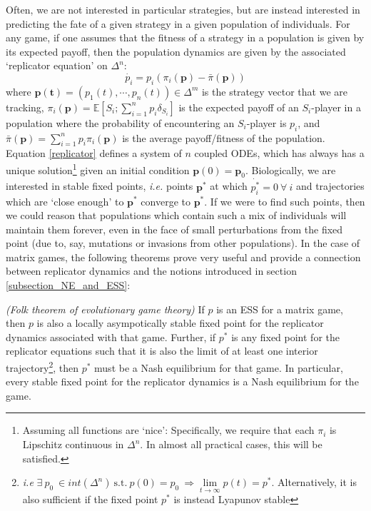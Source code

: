 Often, we are not interested in particular strategies, but are instead interested in predicting the fate of a given strategy in  a given population of individuals. For any game, if one assumes that the fitness of a strategy in a population is given by its expected payoff, then the population dynamics are given by the associated `replicator equation' on $\Delta^n$:
\begin{equation}
	\label{replicator}
	\dot{p_i} = p_i(\pi_i(\mathbf{p})-\bar{\pi}(\mathbf{p}))
\end{equation}
where $\mathbf{p(t)}=(p_1(t),\cdots,p_n(t)) \in \Delta^m$ is the strategy vector that we are tracking, $\pi_i(\mathbf{p}) = \mathbb{E}[S_i;\sum\limits_{i=1}^{n} p_i\delta_{S_i}]$ is the expected payoff of an $S_i$-player in a population where the probability of encountering an $S_i$-player is $p_i$, and $\bar{\pi}(\mathbf{p}) = \sum\limits_{i=1}^{n}p_i\pi_i(\mathbf{p})$ is the average payoff/fitness of the population.\\
Equation \eqref{replicator} defines a system of $n$ coupled ODEs, which has always has a unique solution\footnote{Assuming all functions are `nice': Specifically, we require that each $\pi_i$ is Lipschitz continuous in $\Delta^n$. In almost all practical cases, this will be satisfied.} given an initial condition $\mathbf{p}(0)=\mathbf{p}_{0}$. Biologically, we are interested in stable fixed points, \textit{i.e.} points $\mathbf{p^*}$ at which $\dot{p^{*}_i} = 0 \ \forall \ i$ and trajectories which are `close enough' to $\mathbf{p^*}$ converge to $\mathbf{p^*}$. If we were to find such points, then we could reason that populations which contain such a mix of individuals will maintain them forever, even in the face of small perturbations from the fixed point (due to, say, mutations or invasions from other populations). In the case of matrix games, the following theorems prove very useful and provide a connection between replicator dynamics and the notions introduced in section \ref{subsection_NE_and_ESS}:
\begin{theorem}\emph{(Folk theorem of evolutionary game theory) }
	If $p$ is an ESS for a matrix game, then $p$ is also a locally asympotically stable fixed point for the replicator dynamics associated with that game. Further, if $p^*$ is any fixed point for the replicator equations such that it is also the limit of at least one interior trajectory\footnote{\textit{i.e} $\exists \ p_0 \ \in int(\Delta^n) \ \textrm{s.t.} \ p(0) = p_0 \ \Rightarrow \lim\limits_{t\to\infty}p(t)=p^*$. Alternatively, it is also sufficient if the fixed point $p^*$ is instead Lyapunov stable}, then $p^*$ must be a Nash equilibrium for that game. In particular, every stable fixed point for the replicator dynamics is a Nash equilibrium for the game.
\end{theorem}
